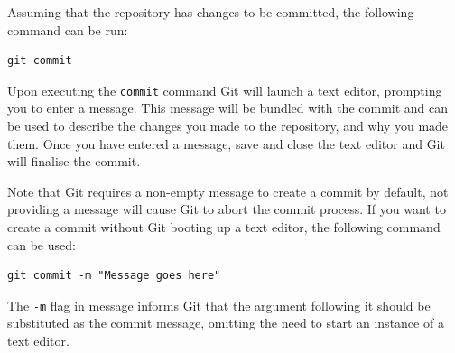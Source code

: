 \documentclass[11pt, a4paper, titlepage]{article}
\begin{document}
Assuming that the repository has changes to be committed, the following command
can be run:

\begin{lstlisting}[label=lst_commit,
caption=Commiting changes to a Git repository]
 git commit
\end{lstlisting}
Upon executing the {\tt commit} command Git will launch a text editor,
prompting you to enter a message.
This message will be bundled with the commit and can be used to describe the
changes you made to the repository, and why you made them.
Once you have entered a message, save and close the text editor and Git will
finalise the commit.

Note that Git requires a non-empty message to create a commit by default, not
providing a message will cause Git to abort the commit process.
If you want to create a commit without Git booting up a text editor, the
following command can be used:
\begin{lstlisting}[label=lst_commit_m,
caption=Commiting with a message via one command.]
 git commit -m "Message goes here"
\end{lstlisting}
The {\tt -m} flag in message informs Git that the argument following it should
be substituted as the commit message, omitting the need to start an instance
of a text editor.
\end{document}
